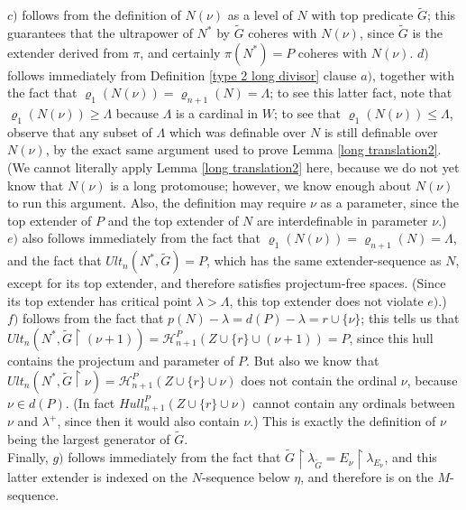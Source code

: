 \documentclass[12pt]{article}
\begin{document}
$c)$ follows from the definition of $N (\nu)$ as a level of $N$ with top predicate $\tilde{G}$; this guarantees that the ultrapower of $N^*$ by $\tilde{G}$ coheres with $N (\nu)$, since $\tilde{G}$ is the extender derived from $\pi$, and certainly $\pi (N^*) = P$ coheres with $N (\nu)$.  $d)$ follows immediately from Definition \ref{type 2 long divisor} clause $a)$, together with the fact that $\varrho_1 (N(\nu)) = \varrho_{n+1} (N) = \Lambda$; to see this latter fact, note that $\varrho_1 (N (\nu)) \geq \Lambda$ because $\Lambda$ is a cardinal in $W$; to see that $\varrho_1 (N (\nu )) \leq \Lambda$, observe that any subset of $\Lambda$ which was definable over $N$ is still definable over $N(\nu)$, by the exact same argument used to prove Lemma \ref{long translation2}.  (We cannot literally apply Lemma \ref{long translation2} here, because we do not yet know that $N(\nu)$ is a long protomouse; however, we know enough about $N (\nu)$ to run this argument.  Also, the definition may require $\nu$ as a parameter, since the top extender of $P$ and the top extender of $N$ are interdefinable in parameter $\nu$.)\\

$e)$ also follows immediately from the fact that $\varrho_1 (N(\nu)) = \varrho_{n+1} (N) = \Lambda$, and the fact that $Ult_n (N^* , \tilde{G}) = P$, which has the same extender-sequence as $N$, except for its top extender, and therefore satisfies projectum-free spaces.  (Since its top extender has critical point $\lambda > \Lambda$, this top extender does not violate $e)$.)\\  



$f)$ follows from the fact that $p(N) - \lambda  = d(P) - \lambda =  r \cup \{ \nu \}$; this tells us that $Ult_n (N^* , \tilde{G} \restriction (\nu + 1)) = \mathcal{H}_{n+1}^P ( Z \cup \{ r \} \cup (\nu + 1 )) = P$, since this hull contains the projectum and parameter of $P$.  But also we know that $Ult_n (N^* , \tilde{G} \restriction \nu) = \mathcal{H}_{n+1}^P ( Z \cup \{ r \} \cup \nu )$ does not contain the ordinal $\nu$, because $\nu \in d(P)$.  (In fact $Hull_{n+1}^P ( Z \cup \{ r \} \cup \nu )$ cannot contain any ordinals between $\nu$ and $\lambda^+$, since then it would also contain $\nu$.)  This is exactly the definition of $\nu$ being the largest generator of $\tilde{G}$.\\

Finally, $g)$ follows immediately from the fact that $\tilde{G} \restriction \lambda_{\tilde{G}} = E_{\nu} \restriction \lambda_{E_\nu}$, and this latter extender is indexed on the $N$-sequence below $\eta$, and therefore is on the $M$-sequence.\\
\end{document}
